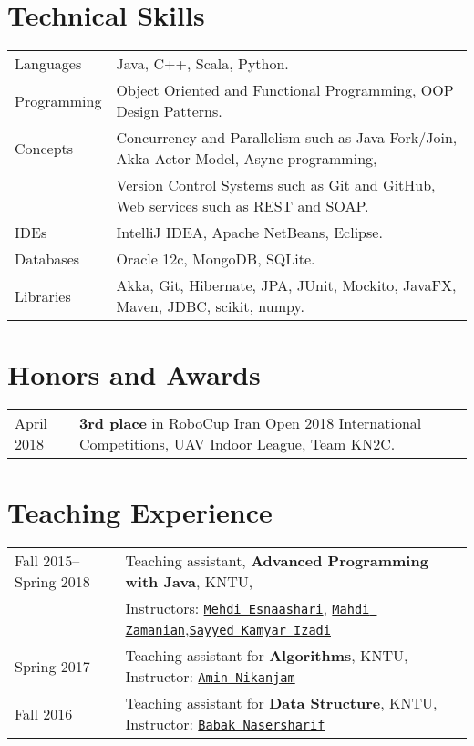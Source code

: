 \documentclass[letterpaper]{article}
\begin{document}
\section*{Technical Skills}

{\renewcommand{\arraystretch}{1.2}
\begin{tabular}{l l}
Languages & Java, C++, Scala, Python.
\\
Programming & Object Oriented and Functional Programming, OOP Design Patterns.
\\
Concepts & Concurrency and Parallelism such as Java Fork/Join, Akka Actor Model, Async programming, \\ & Version Control Systems such as Git and GitHub, Web services such as REST and SOAP.
\\
IDEs & IntelliJ IDEA, Apache NetBeans, Eclipse.
\\
Databases & Oracle 12c, MongoDB, SQLite.
\\
Libraries & Akka, Git, Hibernate, JPA, JUnit, Mockito, JavaFX, Maven, JDBC, scikit, numpy.
\end{tabular}

\section*{Honors and Awards}

{\renewcommand{\arraystretch}{1.2}
\begin{tabular}{l l}
April 2018 & \textbf{3rd place} in RoboCup Iran Open 2018 International Competitions, UAV Indoor League, Team KN2C.
\end{tabular}

\section*{Teaching Experience}

{\renewcommand{\arraystretch}{1.2}
\begin{tabular}{l l}
Fall 2015--Spring 2018 & Teaching assistant, \textbf{Advanced Programming with Java}, KNTU, \\&Instructors: \href{https://scholar.google.com/citations?hl=en&user=kf0UQKMAAAAJ}{\tt Mehdi Esnaashari}, \href{http://wp.kntu.ac.ir/zamanian/}{\tt Mahdi Zamanian},\href{http://wwwlgis.informatik.uni-kl.de/cms/dbis/staff/formermembers/izadi/}{\tt Sayyed Kamyar Izadi} 
\\
Spring 2017 & Teaching assistant for \textbf{Algorithms}, KNTU, Instructor: \href{https://scholar.google.com/citations?user=mGF6p48AAAAJ&hl=en}{\tt Amin Nikanjam} 
\\
Fall 2016 & Teaching assistant for \textbf{Data Structure}, KNTU, Instructor: \href{http://wp.kntu.ac.ir/bnasersharif/}{\tt Babak Nasersharif} 


\end{tabular}}}}
\end{document}
